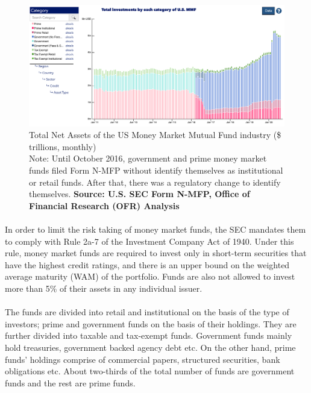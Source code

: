 \documentclass[11pt]{article}
\begin{document}
\begin{figure}[!htb]
\centerline{\includegraphics[width=7in]{fig1.png}}
\caption{Total Net Assets of the US Money Market Mutual Fund industry (\$ trillions, monthly)\\
Note: Until October 2016, government and prime money market funds filed Form N-MFP without identify themselves as institutional or retail funds. After that, there was a regulatory change to identify themselves.
\textbf{Source: U.S. SEC Form N-MFP, Office of Financial Research (OFR) Analysis}}
\label{fig:1}
\end{figure}


\paragraph{} In order to limit the risk taking of money market funds, the SEC mandates them to comply with Rule 2a-7 of the Investment Company Act of 1940. Under this rule, money market funds are required to invest only in short-term securities that have the highest credit ratings, and there is an upper bound on the weighted average maturity (WAM) of the portfolio. Funds are also not allowed to invest more than 5\% of their assets in any individual issuer. 

\paragraph{} The funds are divided into retail and institutional on the basis of the type of investors; prime and government funds on the basis of their holdings. They are further divided into taxable and tax-exempt funds. Government funds mainly hold treasuries, government backed agency debt etc. On the other hand, prime funds' holdings comprise of commercial papers, structured securities, bank obligations etc. About two-thirds of the total number of funds are government funds and the rest are prime funds. 
\end{document}
